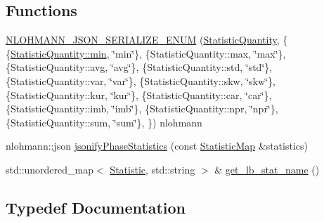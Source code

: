 \subsection*{Functions}
\begin{DoxyCompactItemize}
\item 
\hyperlink{namespacevt_1_1vrt_1_1collection_1_1lb_aeb7ccb2ce4711e921658f65fef098f82}{N\+L\+O\+H\+M\+A\+N\+N\+\_\+\+J\+S\+O\+N\+\_\+\+S\+E\+R\+I\+A\+L\+I\+Z\+E\+\_\+\+E\+N\+UM} (\hyperlink{namespacevt_1_1vrt_1_1collection_1_1lb_a74989c7b4dd16fcc067e90a29cd1febe}{Statistic\+Quantity}, \{ \{\hyperlink{namespacevt_1_1vrt_1_1collection_1_1lb_a74989c7b4dd16fcc067e90a29cd1febead8bd79cc131920d5de426f914d17405a}{Statistic\+Quantity\+::min}, \char`\"{}min\char`\"{}\}, \{Statistic\+Quantity\+::max, \char`\"{}max\char`\"{}\}, \{Statistic\+Quantity\+::avg, \char`\"{}avg\char`\"{}\}, \{Statistic\+Quantity\+::std, \char`\"{}std\char`\"{}\}, \{Statistic\+Quantity\+::var, \char`\"{}var\char`\"{}\}, \{Statistic\+Quantity\+::skw, \char`\"{}skw\char`\"{}\}, \{Statistic\+Quantity\+::kur, \char`\"{}kur\char`\"{}\}, \{Statistic\+Quantity\+::car, \char`\"{}car\char`\"{}\}, \{Statistic\+Quantity\+::imb, \char`\"{}imb\char`\"{}\}, \{Statistic\+Quantity\+::npr, \char`\"{}npr\char`\"{}\}, \{Statistic\+Quantity\+::sum, \char`\"{}sum\char`\"{}\}, \}) nlohmann
\item 
nlohmann\+::json \hyperlink{namespacevt_1_1vrt_1_1collection_1_1lb_a1f9a043bb30515a07d13308e214c1385}{jsonify\+Phase\+Statistics} (const \hyperlink{namespacevt_1_1vrt_1_1collection_1_1lb_a497ad83ef5825f2ea18ed20a228870d3}{Statistic\+Map} \&statistics)
\item 
std\+::unordered\+\_\+map$<$ \hyperlink{namespacevt_1_1vrt_1_1collection_1_1lb_af0e20ef9afee77295053aa83bf1348b1}{Statistic}, std\+::string $>$ \& \hyperlink{namespacevt_1_1vrt_1_1collection_1_1lb_afec8ac9cb9a80a086ce5dee5376deb15}{get\+\_\+lb\+\_\+stat\+\_\+name} ()
\end{DoxyCompactItemize}


\subsection{Typedef Documentation}
\mbox{\label{namespacevt_1_1vrt_1_1collection_1_1lb_a497ad83ef5825f2ea18ed20a228870d3}} 

